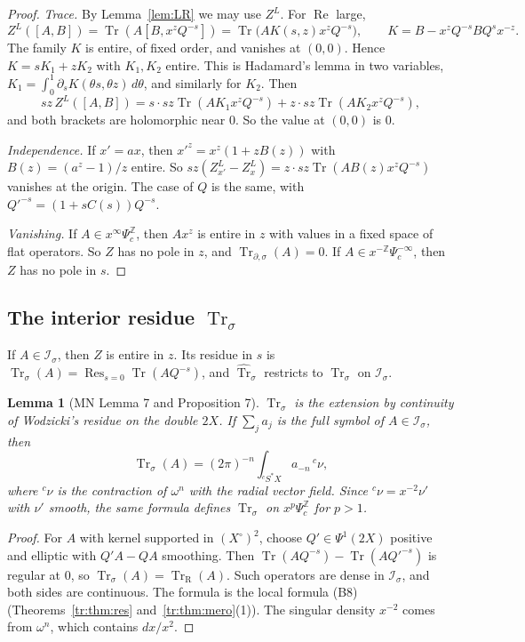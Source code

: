 \documentclass[11pt,oneside,reqno]{article}
\DeclareMathOperator{\Tr}{Tr}
\DeclareMathOperator{\Res}{Res}
\newcommand{\Z}{\mathbb Z}
\newcommand{\Is}{\mathcal I_\sigma}
\newcommand{\Psic}{\Psi_{c}}
\newcommand{\Trs}{\Tr_\sigma}
\newcommand{\Trds}{\Tr_{\partial,\sigma}}
\newcommand{\hTrs}{\widehat{\Tr}_\sigma}
\newcommand{\TrR}{\Tr_{\mathrm R}}
\newcommand{\Y}{{}^cS^*X}
\theoremstyle{plain}
\newtheorem{lemma}[theorem]{Lemma}
\theoremstyle{definition}
\theoremstyle{remark}
\begin{document}
\begin{proof}
\emph{Trace.} By Lemma~\ref{lem:LR} we may use \(Z^L\). For
\(\operatorname{Re}\) large,
\[
 Z^L([A,B])=\Tr(A[B,x^zQ^{-s}])=\Tr\bigl(AK(s,z)x^zQ^{-s}\bigr),\qquad
 K=B-x^zQ^{-s}BQ^sx^{-z}.
\]
The family \(K\) is entire, of fixed order, and vanishes at \((0,0)\).
Hence \(K=sK_1+zK_2\) with \(K_1,K_2\) entire. This is Hadamard's lemma in
two variables, \(K_1=\int_0^1\partial_sK(\theta s,\theta z)\,d\theta\), and
similarly for \(K_2\). Then
\[
 sz\,Z^L([A,B])=s\cdot sz\Tr(AK_1x^zQ^{-s})+z\cdot sz\Tr(AK_2x^zQ^{-s}),
\]
and both brackets are holomorphic near \(0\). So the value at \((0,0)\) is
\(0\).

\emph{Independence.} If \(x'=ax\), then \(x'^z=x^z(1+zB(z))\) with
\(B(z)=(a^z-1)/z\) entire. So \(sz(Z^L_{x'}-Z^L_x)=z\cdot sz\Tr(AB(z)x^z
Q^{-s})\) vanishes at the origin. The case of \(Q\) is the same, with
\(Q'^{-s}=(1+sC(s))Q^{-s}\).

\emph{Vanishing.} If \(A\in x^\infty\Psic^{\Z}\), then \(Ax^z\) is entire
in \(z\) with values in a fixed space of flat operators. So \(Z\) has no
pole in \(z\), and \(\Trds(A)=0\). If \(A\in x^{-\Z}\Psic^{-\infty}\), then
\(Z\) has no pole in \(s\).
\end{proof}

\subsection{The interior residue \texorpdfstring{\(\Trs\)}{Tr-sigma}}
If \(A\in\Is\), then \(Z\) is entire in \(z\). Its residue in \(s\) is
\(\Trs(A)=\Res_{s=0}\Tr(AQ^{-s})\), and \(\hTrs\) restricts to \(\Trs\)
on \(\Is\).

\begin{lemma}[MN Lemma 7 and Proposition 7]\label{lem:Trs}
\(\Trs\) is the extension by continuity of Wodzicki's residue on the
double \(2X\). If \(\sum_ja_j\) is the full symbol of \(A\in\Is\), then
\[
 \Trs(A)=(2\pi)^{-n}\int_{\Y}a_{-n}\,{}^c\nu ,
\]
where \({}^c\nu\) is the contraction of \(\omega^n\) with the radial
vector field. Since \({}^c\nu=x^{-2}\nu'\) with \(\nu'\) smooth, the same
formula defines \(\Trs\) on \(x^p\Psic^{\Z}\) for \(p>1\).
\end{lemma}

\begin{proof}
For \(A\) with kernel supported in \((X^\circ)^2\), choose \(Q'\in
\Psi^1(2X)\) positive and elliptic with \(Q'A-QA\) smoothing. Then
\(\Tr(AQ^{-s})-\Tr(AQ'^{-s})\) is regular at \(0\), so \(\Trs(A)=\TrR(A)\).
Such operators are dense in \(\Is\), and both sides are continuous. The
formula is the local formula (B8) (Theorems~\ref{tr:thm:res}
and~\ref{tr:thm:mero}(1)). The singular density \(x^{-2}\) comes
from \(\omega^n\), which contains \(dx/x^2\).
\end{proof}
\end{document}
